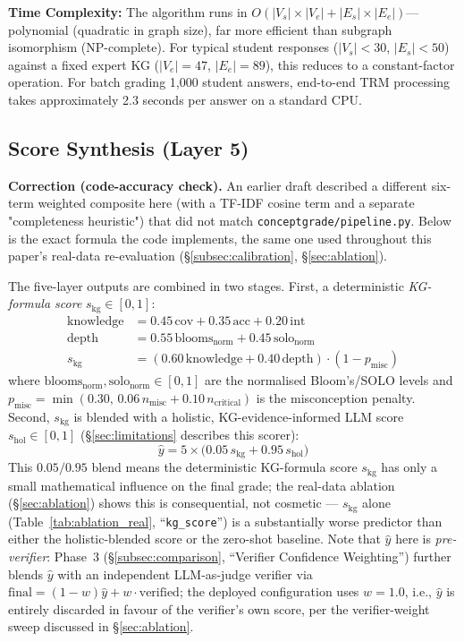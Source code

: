 \documentclass[conference]{IEEEtran}
\begin{document}
\textbf{Time Complexity:} The algorithm runs in $O(|V_s| \times |V_e| + |E_s| \times |E_e|)$—
polynomial (quadratic in graph size), far more efficient than subgraph isomorphism
(NP-complete). For typical student responses ($|V_s| < 30$, $|E_s| < 50$) against
a fixed expert KG ($|V_e| = 47$, $|E_e| = 89$), this reduces to a constant-factor
operation. For batch grading 1,000 student answers, end-to-end TRM processing
takes approximately 2.3 seconds per answer on a standard CPU.

\subsection{Score Synthesis (Layer 5)}
\label{subsec:synthesis}

\textbf{Correction (code-accuracy check).} An earlier draft described a
different six-term weighted composite here (with a TF-IDF cosine term
and a separate "completeness heuristic") that did not match
\texttt{conceptgrade/pipeline.py}. Below is the exact formula the code
implements, the same one used throughout this paper's real-data
re-evaluation (\S\ref{subsec:calibration}, \S\ref{sec:ablation}).

The five-layer outputs are combined in two stages. First, a deterministic
\emph{KG-formula score} $s_{\text{kg}} \in [0,1]$:
\begin{align}
  \text{knowledge} &= 0.45\,\text{cov} + 0.35\,\text{acc} + 0.20\,\text{int} \nonumber \\
  \text{depth} &= 0.55\,\text{blooms}_{\text{norm}} + 0.45\,\text{solo}_{\text{norm}} \nonumber \\
  s_{\text{kg}} &= (0.60\,\text{knowledge} + 0.40\,\text{depth})\cdot(1 - p_{\text{misc}})
  \label{eq:kgformula}
\end{align}
where $\text{blooms}_{\text{norm}}, \text{solo}_{\text{norm}} \in [0,1]$
are the normalised Bloom's/SOLO levels and $p_{\text{misc}} =
\min(0.30,\, 0.06\,n_{\text{misc}} + 0.10\,n_{\text{critical}})$ is the
misconception penalty. Second, $s_{\text{kg}}$ is blended with a
holistic, KG-evidence-informed LLM score $s_{\text{hol}} \in [0,1]$
(\S\ref{sec:limitations} describes this scorer):
\begin{equation}
  \hat{y} = 5 \times \bigl(0.05\,s_{\text{kg}} + 0.95\,s_{\text{hol}}\bigr)
  \label{eq:composite}
\end{equation}
This $0.05/0.95$ blend means the deterministic KG-formula score
$s_{\text{kg}}$ has only a small mathematical influence on the final
grade; the real-data ablation (\S\ref{sec:ablation}) shows this is
consequential, not cosmetic --- $s_{\text{kg}}$ alone (Table~\ref{tab:ablation_real}, ``\texttt{kg\_score}'')
is a substantially worse predictor than either the holistic-blended
score or the zero-shot baseline. Note that $\hat{y}$ here is
\emph{pre-verifier}: Phase~3 (\S\ref{subsec:comparison}, ``Verifier
Confidence Weighting'') further blends $\hat{y}$ with an independent
LLM-as-judge verifier \cite{zheng2023llmjudge} via
$\text{final} = (1-w)\hat{y} + w\cdot\text{verified}$;
the deployed configuration uses $w=1.0$, i.e., $\hat{y}$ is entirely
discarded in favour of the verifier's own score, per the verifier-weight
sweep discussed in \S\ref{sec:ablation}.
\end{document}
